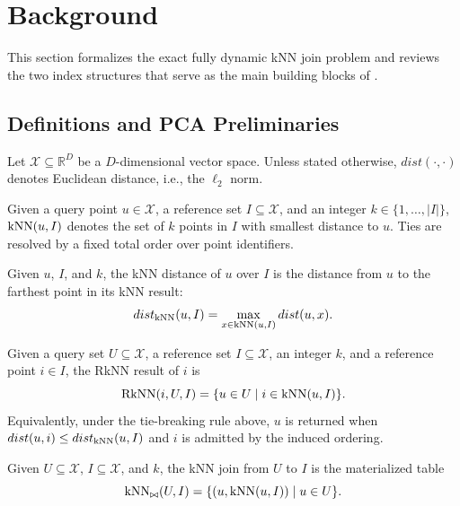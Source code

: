 \section{Background}\label{background}

This section formalizes the exact fully dynamic kNN join problem and reviews the two index structures that serve as the main building blocks of \dualtree.

\subsection{Definitions and PCA Preliminaries}\label{sec:background-preliminaries}

Let $\mathcal{X}\subseteq\mathbb{R}^D$ be a $D$-dimensional vector space. Unless stated otherwise, $dist(\cdot,\cdot)$ denotes Euclidean distance, i.e., the $\ell_2$ norm.

\begin{definition}\label{def:knns}
Given a query point $u\in\mathcal{X}$, a reference set $I\subseteq\mathcal{X}$, and an integer $k\in\{1,\ldots,|I|\}$, $\operatorname{kNN}(u,I)$ denotes the set of $k$ points in $I$ with smallest distance to $u$. Ties are resolved by a fixed total order over point identifiers.
\end{definition}

\begin{definition}\label{def:dknn}
Given $u$, $I$, and $k$, the kNN distance of $u$ over $I$ is the distance from $u$ to the farthest point in its kNN result:
\[
dist_{\operatorname{kNN}}(u,I)=\max_{x\in \operatorname{kNN}(u,I)} dist(u,x).
\]
\end{definition}

\begin{definition}\label{def:rknn}
Given a query set $U\subseteq\mathcal{X}$, a reference set $I\subseteq\mathcal{X}$, an integer $k$, and a reference point $i\in I$, the RkNN result of $i$ is
\[
\operatorname{RkNN}(i,U,I)=\{u\in U \mid i\in \operatorname{kNN}(u,I)\}.
\]
Equivalently, under the tie-breaking rule above, $u$ is returned when $dist(u,i)\le dist_{\operatorname{kNN}}(u,I)$ and $i$ is admitted by the induced ordering.
\end{definition}

\begin{definition}\label{def:knnj}
Given $U\subseteq\mathcal{X}$, $I\subseteq\mathcal{X}$, and $k$, the kNN join from $U$ to $I$ is the materialized table
\begin{equation}
  \operatorname{kNN}_{\bowtie}(U,I)=
  \{(u,\operatorname{kNN}(u,I))\mid u\in U\}.
\end{equation}
\end{definition}

